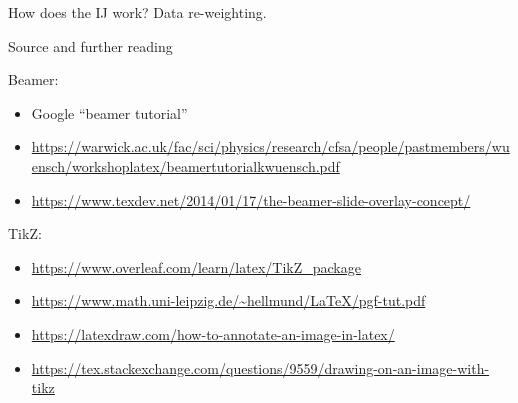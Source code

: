 \documentclass[8pt]{beamer}\usepackage[]{graphicx}\usepackage[]{color}
\def\expect#1#2{\underset{#1}{\mathbb{E}}\left[#2\right]}
\def\x{x}
\def\w{w}
\def\infl{\psi}
\begin{document}
\begin{frame}{How does the IJ work?  Data re-weighting.}
\begin{minipage}{0.49\textwidth}
\end{minipage}


\end{frame}




\begin{frame}{Source and further reading}

Beamer:
{\tiny
\begin{itemize}
\item Google ``beamer tutorial''
\item \url{https://warwick.ac.uk/fac/sci/physics/research/cfsa/people/pastmembers/wuensch/workshoplatex/beamertutorialkwuensch.pdf}
\item \url{https://www.texdev.net/2014/01/17/the-beamer-slide-overlay-concept/}\\
\end{itemize}
}

TikZ:
{\tiny
\begin{itemize}
\item \url{https://www.overleaf.com/learn/latex/TikZ_package}
\item \url{https://www.math.uni-leipzig.de/~hellmund/LaTeX/pgf-tut.pdf}
\item \url{https://latexdraw.com/how-to-annotate-an-image-in-latex/}
\item \url{https://tex.stackexchange.com/questions/9559/drawing-on-an-image-with-tikz}
\end{itemize}
}

\end{frame}
\end{document}
